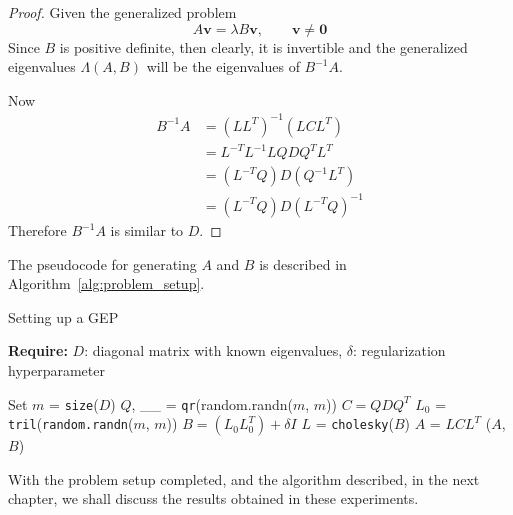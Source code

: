 \begin{proof}
	Given the generalized problem
	\begin{equation}
		A \mathbf{v} = \lambda B \mathbf{v}, \qquad \mathbf{v} \neq \mathbf{0}
	\end{equation}
	Since $B$ is positive definite, then clearly, it is invertible and the generalized eigenvalues $\Lambda(A, B)$ will be the eigenvalues of $B^{-1}A$.

	Now
	\begin{align*}
		B^{-1}A & = (LL^T)^{-1}(LCL^T)\\
		& = L^{-T}L^{-1}LQDQ^{T}L^T\\
		& = (L^{-T}Q)D(Q^{-1}L^{T}) \\
		& = (L^{-T}Q)D(L^{-T}Q)^{-1}
	\end{align*}
	Therefore $B^{-1}A$ is similar to $D$.
\end{proof}
The pseudocode for generating $A$ and $B$ is described in Algorithm~\ref{alg:problem_setup}.
\begin{algorithm}
	\caption{Setting up a GEP}
	\label{alg:problem_setup}
	
	\textbf{Require:} \( D \): diagonal matrix with known eigenvalues, \(\delta\): regularization hyperparameter
	\begin{algorithmic}[1]
		\State Set $m$ = \texttt{size}($D$)
		\State $Q$, \_\_ = \texttt{qr}(random.randn($m$, $m$))
		\State $C = QDQ^T$
		\State $L_{0}$ = \texttt{tril}(\texttt{random.randn}($m$, $m$))
		\State $B = (L_0 L_0^T) + \delta I$
		\State $L$ = \texttt{cholesky}($B$)
		\State $A$ = $LCL^T$
		\State \Return ($A$, $B$)
		\EndFunction
	\end{algorithmic}
\end{algorithm}
With the problem setup completed, and the algorithm described, in the next chapter, we shall discuss the results obtained in these experiments.


